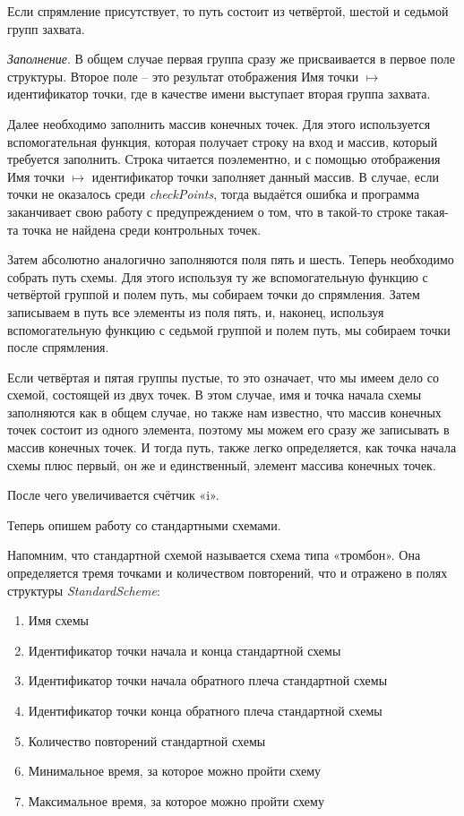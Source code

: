 \documentclass[12pt, a4 paper]{article}
\theoremstyle{plain}
\begin{document}
Если спрямление присутствует, то путь состоит из четвёртой, шестой и седьмой групп захвата.

\large\textit{Заполнение}. \normalsize В общем случае первая группа сразу же присваивается в первое поле структуры. Второе поле – это результат отображения Имя точки $\mapsto$ идентификатор точки, где в качестве имени выступает вторая группа захвата.

Далее необходимо заполнить массив конечных точек. Для этого используется вспомогательная функция, которая получает строку на вход и массив, который требуется заполнить. Строка читается поэлементно, и с помощью отображения Имя точки $\mapsto$ идентификатор точки заполняет данный массив. В случае, если точки не оказалось среди \textit{checkPoints}, тогда выдаётся ошибка и программа заканчивает свою работу с предупреждением о том, что в такой-то строке такая-та точка не найдена среди контрольных точек.

Затем абсолютно аналогично заполняются поля пять и шесть. Теперь необходимо собрать путь схемы. Для этого используя ту же вспомогательную функцию с четвёртой группой и полем путь, мы собираем точки до спрямления. Затем записываем в путь все элементы из поля пять, и, наконец, используя вспомогательную функцию с седьмой группой и полем путь, мы собираем точки после спрямления.

Если четвёртая и пятая группы пустые, то это означает, что мы имеем дело со схемой, состоящей из двух точек. В этом случае, имя и точка начала схемы заполняются как в общем случае, но также нам известно, что массив конечных точек состоит из одного элемента, поэтому мы можем его сразу же записывать в массив конечных точек. И тогда путь, также легко определяется, как точка начала схемы плюс первый, он же и единственный, элемент массива конечных точек.

После чего увеличивается счётчик «i».

\bigskip

Теперь опишем работу со стандартными схемами.

Напомним, что стандартной схемой называется схема типа «тромбон». Она определяется тремя точками и количеством повторений, что и отражено в полях структуры \textit{StandardScheme}:

\begin{enumerate}
	\item Имя схемы
	\item Идентификатор точки начала и конца стандартной схемы
	\item Идентификатор точки начала обратного плеча стандартной схемы
	\item Идентификатор точки конца обратного плеча стандартной схемы
	\item Количество повторений стандартной схемы
	\item Минимальное время, за которое можно пройти схему
	\item Максимальное время, за которое можно пройти схему
\end{enumerate}
\end{document}
